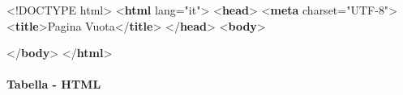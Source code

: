 \documentclass[italian,a4paper]{article}
\newenvironment{Shaded}{}{}
\newcommand{\DataTypeTok}[1]{\textcolor[rgb]{0.56,0.13,0.00}{#1}}
\newcommand{\KeywordTok}[1]{\textcolor[rgb]{0.00,0.44,0.13}{\textbf{#1}}}
\newcommand{\NormalTok}[1]{#1}
\newcommand{\OperatorTok}[1]{\textcolor[rgb]{0.40,0.40,0.40}{#1}}
\newcommand{\OtherTok}[1]{\textcolor[rgb]{0.00,0.44,0.13}{#1}}
\newcommand{\StringTok}[1]{\textcolor[rgb]{0.25,0.44,0.63}{#1}}
\begin{document}
\begin{Shaded}
\begin{Highlighting}[]
\DataTypeTok{\textless{}!DOCTYPE}\NormalTok{ html}\DataTypeTok{\textgreater{}}
\DataTypeTok{\textless{}}\KeywordTok{html}\OtherTok{ lang}\OperatorTok{=}\StringTok{"it"}\DataTypeTok{\textgreater{}}
\DataTypeTok{\textless{}}\KeywordTok{head}\DataTypeTok{\textgreater{}}
    \DataTypeTok{\textless{}}\KeywordTok{meta}\OtherTok{ charset}\OperatorTok{=}\StringTok{"UTF{-}8"}\DataTypeTok{\textgreater{}}
    \DataTypeTok{\textless{}}\KeywordTok{title}\DataTypeTok{\textgreater{}}\NormalTok{Pagina Vuota}\DataTypeTok{\textless{}/}\KeywordTok{title}\DataTypeTok{\textgreater{}}
\DataTypeTok{\textless{}/}\KeywordTok{head}\DataTypeTok{\textgreater{}}
\DataTypeTok{\textless{}}\KeywordTok{body}\DataTypeTok{\textgreater{}}

\DataTypeTok{\textless{}/}\KeywordTok{body}\DataTypeTok{\textgreater{}}
\DataTypeTok{\textless{}/}\KeywordTok{html}\DataTypeTok{\textgreater{}}
\end{Highlighting}
\end{Shaded}




\paragraph{Tabella - HTML}\label{tabella---html}
\end{document}
